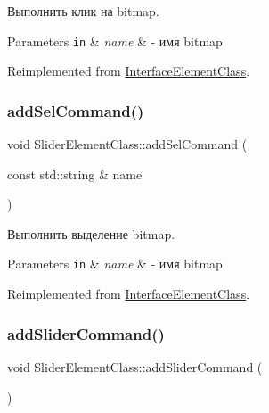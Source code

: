 Выполнить клик на bitmap. 


\begin{DoxyParams}[1]{Parameters}
\mbox{\tt in}  & {\em name} & -\/ имя bitmap \\
\hline
\end{DoxyParams}


Reimplemented from \hyperlink{class_interface_element_class_af1061f10847c0c30a5815e64892e8d60}{Interface\+Element\+Class}.

\mbox{\label{class_slider_element_class_a37d2eff7e6d2a0f2c0cd628dafb096e5}} 
\subsubsection{\texorpdfstring{add\+Sel\+Command()}{addSelCommand()}}
{\footnotesize\ttfamily void Slider\+Element\+Class\+::add\+Sel\+Command (\begin{DoxyParamCaption}\item[{const std\+::string \&}]{name }\end{DoxyParamCaption})\hspace{0.3cm}{\ttfamily [virtual]}}



Выполнить выделение bitmap. 


\begin{DoxyParams}[1]{Parameters}
\mbox{\tt in}  & {\em name} & -\/ имя bitmap \\
\hline
\end{DoxyParams}


Reimplemented from \hyperlink{class_interface_element_class_a47b6374245f1b3a2c56366b8819f1569}{Interface\+Element\+Class}.

\mbox{\label{class_slider_element_class_aa47097c84ebf1a0f32ba42cc853d9819}} 
\subsubsection{\texorpdfstring{add\+Slider\+Command()}{addSliderCommand()}}
{\footnotesize\ttfamily void Slider\+Element\+Class\+::add\+Slider\+Command (\begin{DoxyParamCaption}{ }\end{DoxyParamCaption})}



